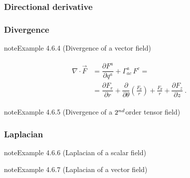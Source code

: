 \documentclass[letterpaper,10pt,english]{jupyterBook}
\begin{document}
\subsubsection{Directional derivative}
\label{\detokenize{ch/tensor-algebra-calculus/calculus-euclidean-cylindrical:directional-derivative}}\label{\detokenize{ch/tensor-algebra-calculus/calculus-euclidean-cylindrical:tensor-calculus-cylindrical-differential-operators-directional-der}}

\subsubsection{Divergence}
\label{\detokenize{ch/tensor-algebra-calculus/calculus-euclidean-cylindrical:divergence}}\label{\detokenize{ch/tensor-algebra-calculus/calculus-euclidean-cylindrical:tensor-calculus-cylindrical-differential-operators-divergence}}\label{ch/tensor-algebra-calculus/calculus-euclidean-cylindrical:example-3}
\begin{sphinxadmonition}{note}{Example 4.6.4 (Divergence of a vector field)}


\begin{equation*}
\begin{split}\begin{aligned}
  \nabla \cdot \vec{F} 
  & = \dfrac{\partial F^a}{\partial q^a} + \Gamma_{ac}^a \, F^c = \\
  & = \dfrac{\partial F_r}{\partial r} + \dfrac{\partial}{\partial \theta}\left( \frac{F_\theta}{r} \right) + \frac{F_\theta}{r} + \dfrac{\partial F_z}{\partial z} \ .
\end{aligned}\end{split}
\end{equation*}\end{sphinxadmonition}
\label{ch/tensor-algebra-calculus/calculus-euclidean-cylindrical:example-4}
\begin{sphinxadmonition}{note}{Example 4.6.5 (Divergence of a \protect\(2^{nd}\protect\)\sphinxhyphen{}order tensor field)}


\end{sphinxadmonition}


\subsubsection{Laplacian}
\label{\detokenize{ch/tensor-algebra-calculus/calculus-euclidean-cylindrical:laplacian}}\label{ch/tensor-algebra-calculus/calculus-euclidean-cylindrical:example-5}
\begin{sphinxadmonition}{note}{Example 4.6.6 (Laplacian of a scalar field)}


\end{sphinxadmonition}
\label{ch/tensor-algebra-calculus/calculus-euclidean-cylindrical:example-6}
\begin{sphinxadmonition}{note}{Example 4.6.7 (Laplacian of a vector field)}


\end{sphinxadmonition}
\end{document}
